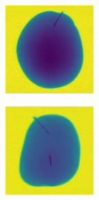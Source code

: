 \documentclass[11pt]{article}
\begin{document}
    \clearpage
    \begin{figure}[!h]
    \captionsetup[subfigure]{labelformat=empty}
    \ContinuedFloat
    \captionsetup{list=no}
    \begin{subfigure}[b]{0.22\textwidth}
         \centering
         \includegraphics[width=\textwidth]{figurer/potato_dataset/metal/metal_20.jpg}
         \caption{}
         \label{fig:metal_20}
     \end{subfigure}
     \hfill
     \begin{subfigure}[b]{0.22\textwidth}
         \centering
         \includegraphics[width=\textwidth]{figurer/potato_dataset/metal/metal_21.jpg}

\end{subfigure}
\end{figure}
\end{document}

